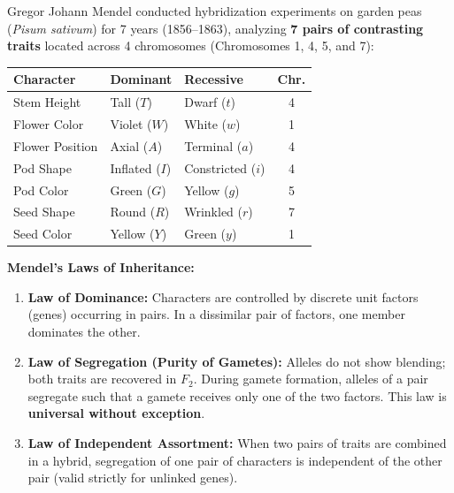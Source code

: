 \documentclass[10pt,twoside,openright]{book}
\begin{document}
\begin{conceptbox}
Gregor Johann Mendel conducted hybridization experiments on garden peas (\textit{Pisum sativum}) for 7 years (1856--1863), analyzing \textbf{7 pairs of contrasting traits} located across 4 chromosomes (Chromosomes 1, 4, 5, and 7):
\begin{center}
\footnotesize
\setlength{\tabcolsep}{2.5pt}
\renewcommand{\arraystretch}{1.15}
\begin{tabularx}{\linewidth}{|>{\raggedright\arraybackslash}p{2.1cm}|L|L|c|}
\hline
\textbf{Character} & \textbf{Dominant} & \textbf{Recessive} & \textbf{Chr.} \\
\hline
Stem Height & Tall ($T$) & Dwarf ($t$) & 4 \\
Flower Color & Violet ($W$) & White ($w$) & 1 \\
Flower Position & Axial ($A$) & Terminal ($a$) & 4 \\
Pod Shape & Inflated ($I$) & Constricted ($i$) & 4 \\
Pod Color & Green ($G$) & Yellow ($g$) & 5 \\
Seed Shape & Round ($R$) & Wrinkled ($r$) & 7 \\
Seed Color & Yellow ($Y$) & Green ($y$) & 1 \\
\hline
\end{tabularx}
\end{center}

\textbf{Mendel's Laws of Inheritance:}
\begin{enumerate}
  \item \textbf{Law of Dominance:} Characters are controlled by discrete unit factors (genes) occurring in pairs. In a dissimilar pair of factors, one member dominates the other.
  \item \textbf{Law of Segregation (Purity of Gametes):} Alleles do not show blending; both traits are recovered in $F_2$. During gamete formation, alleles of a pair segregate such that a gamete receives only one of the two factors. This law is \textbf{universal without exception}.
  \item \textbf{Law of Independent Assortment:} When two pairs of traits are combined in a hybrid, segregation of one pair of characters is independent of the other pair (valid strictly for unlinked genes).
\end{enumerate}
\end{conceptbox}
\end{document}
